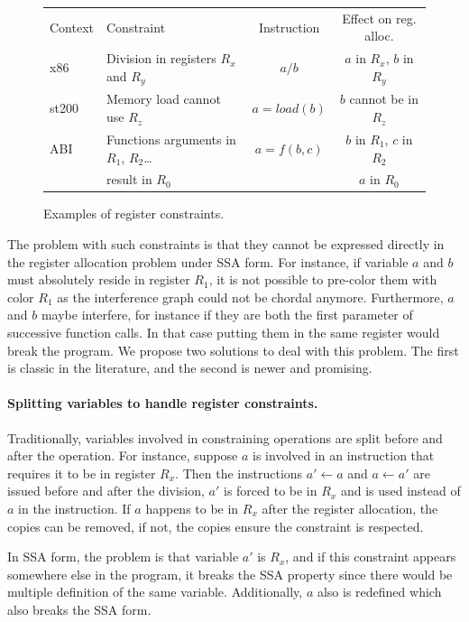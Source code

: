 {\begin{figure}
  \begin{center}
    \begin{tabular}{llcc}
    Context & Constraint  & Instruction & Effect on reg. alloc. \\
    x86 & Division in registers $R_x$ and $R_y$ & $a / b$ & $a$ in $R_x$, $b$ in $R_y$\\
    st200 & Memory load cannot use $R_z$ & $a = load(b)$ & $b$ cannot be in $R_z$\\
    ABI & Functions arguments in $R_1$, $R_2$\ldots & $a = f(b,c)$ & $b$ in $R_1$, $c$ in $R_2$ \\
     & result in $R_0$ & & $a$ in $R_0$\\
  \end{tabular}
  \end{center}
  \caption{Examples of register constraints.}
  \label{fig:reg-constraints}
\end{figure}


The problem with such constraints is that they cannot be expressed directly in 
the register allocation problem under SSA form. For instance, if variable $a$ and $b$ must 
absolutely reside in register $R_1$, it is not possible to pre-color them with 
color $R_1$ as the interference graph could not be chordal anymore.  
Furthermore, $a$ and $b$ maybe interfere, for instance if they are both the 
first parameter of successive function calls. In that case putting them in the 
same register would break the program. We propose two solutions 
to deal with this problem. The first is classic in the literature, and the 
second is newer and promising.


\paragraph{Splitting variables to handle register constraints.}

Traditionally, variables involved in constraining operations are split before and after the operation.
For instance, suppose $a$ is involved in an instruction that requires it to be in register $R_x$.
Then the instructions $a'\gets a$ and $a\gets a'$ are issued before and after the division,
$a'$ is forced to be in $R_x$ and is used instead of $a$ in the instruction.
If $a$ happens to be in $R_x$ after the register allocation, the copies can be removed, if not, the copies ensure the constraint is respected.

In SSA form, the problem is that variable $a'$ is $R_x$, and if this constraint appears somewhere else in the program, it breaks the SSA property since there would be multiple definition of the same variable.
Additionally, $a$ also is redefined which also breaks the SSA form.

}
